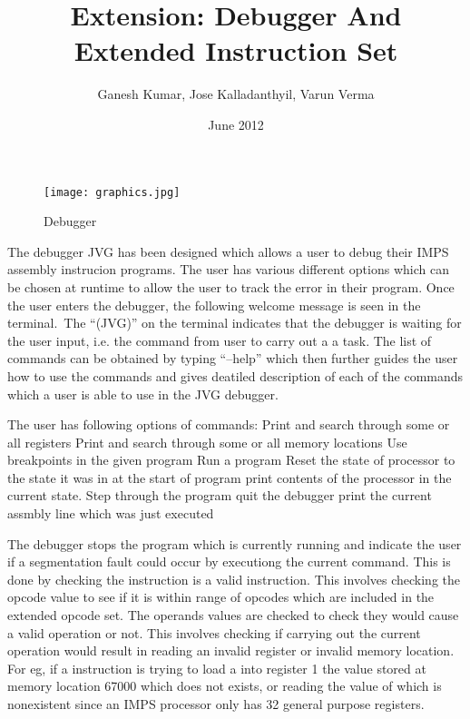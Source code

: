 \documentclass[12pt,a4paper,oneside]{report}
\begin{document}
\title{Extension: Debugger And Extended Instruction Set}
\author{Ganesh Kumar, Jose Kalladanthyil, Varun Verma}
\date{June 2012}
\maketitle

\begin{figure}[htb]
\centering
\texttt{[image: graphics.jpg]}
\caption{Debugger}
\label{fig:awesome_image}
\end{figure}

The debugger JVG has been designed which allows a user to debug their IMPS assembly instrucion programs. The user has various different options which can be chosen at runtime to allow the user to track the error in their program. Once the user enters the debugger, the following welcome message is seen in the terminal.\
The “(JVG)” on the terminal indicates that the debugger is waiting for the user input, i.e. the command from user to carry out a a task. The list of commands can be obtained by typing “--help” which then further guides the user how to use the commands and gives deatiled description of each of the commands which a user is able to use in the JVG debugger.  

The user has following options of commands:
Print and search through some or all registers
Print and search through some or all memory locations
Use breakpoints in the given program
Run a program
Reset the state of processor to the state it was in at the start of program
print contents of the processor in the current state.
Step through the program
quit the debugger
print the current assmbly line which was just executed

The debugger stops the program which is currently running and indicate the user if a segmentation fault could occur by executiong the current command. This is done by checking the instruction is a valid instruction. This involves checking the opcode value to see if it is within range of opcodes which are included in the extended opcode set. The operands values are checked to check they would cause a valid operation or not. This involves checking if carrying out the current operation would result in reading an invalid register or invalid memory location. For eg, if a instruction is trying to load a into register 1 the value stored at memory location 67000 which does not exists, or reading the value of  which is nonexistent since an IMPS processor only has 32 general purpose registers.
\end{document}
